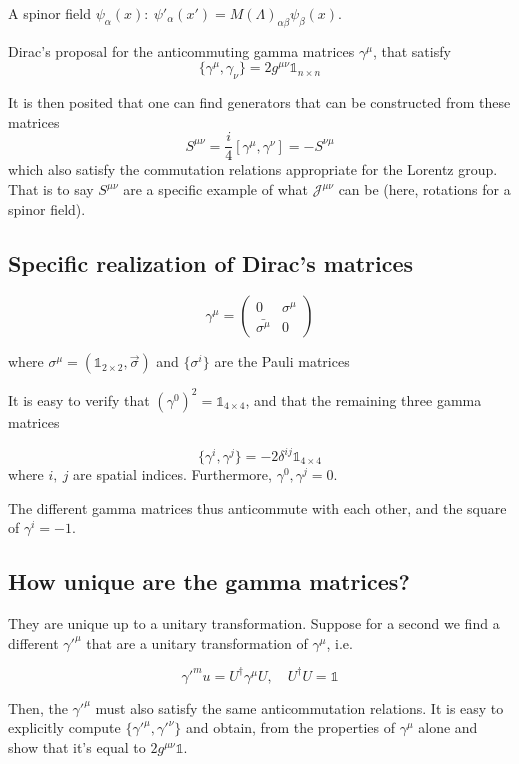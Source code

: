 \documentclass[11pt]{article}
\begin{document}
	
A spinor field $\psi_\alpha(x):\ \psi'_\alpha(x') = M(\Lambda)_{\alpha\beta}\psi_\beta(x)$.


Dirac's proposal for the anticommuting gamma matrices $\gamma^\mu$, that satisfy \[ \{\gamma^\mu, \gamma_\nu\} = 2g^{\mu\nu} \mathbb{1}_{n\times n}\]

		It is then posited that one can find generators that can be constructed from these matrices\[ S^{\mu\nu} = \frac{i}{4} [\gamma^\mu, \gamma^\nu] = -S^{\nu\mu}\] which also satisfy the commutation relations appropriate for the Lorentz group. That is to say $S^{\mu\nu}$ are a specific example of what $\mathcal{J}^{\mu\nu}$ can be (here, rotations for a spinor field).
		
		\subsection*{Specific realization of Dirac's matrices}
		
		\[ \gamma^\mu = \begin{pmatrix}
			0 & \sigma^\mu\\
			\bar{\sigma^\mu} & 0 
		\end{pmatrix}\]	

	where $\sigma^\mu = (\mathbb{1}_{2\times 2}, \vec{\sigma})$ and $\{\sigma^i\}$ are the Pauli matrices
	
	It is easy to verify that $(\gamma^0)^2 = \mathbb{1}_{4\times 4}$, and that the remaining three gamma matrices
	
	\[ \{\gamma^i, \gamma^j\} = -2\delta^{ij} \mathbb{1}_{4\times 4}\] where $i,\ j$ are spatial indices. Furthermore, ${\gamma^0, \gamma^j} = 0$. 
	
	The different gamma matrices thus anticommute with each other, and the square of $\gamma^i = -1$.\\
	
	\subsection*{How unique are the gamma matrices?}
	They are unique up to a unitary transformation. 
	Suppose for a second we find a different $\gamma'^\mu$ that are a unitary transformation of $\gamma^\mu$, i.e.
	
	\[ \gamma'^mu = U^\dagger \gamma^\mu U,\quad U^\dagger U = \mathbb{1}\]
	
	Then, the $\gamma'^\mu$ must also satisfy the same anticommutation relations. It is easy to explicitly compute $\{\gamma'^\mu, \gamma'^\nu\}$ and obtain, from the properties of $\gamma^\mu$ alone and show that it's equal to $2g^{\mu\nu} \mathbb{1}$.
	
\end{document}
